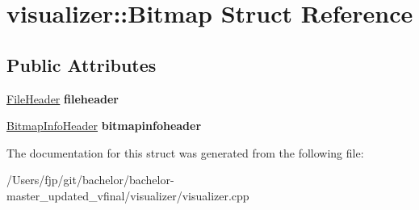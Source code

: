 \hypertarget{structvisualizer_1_1_bitmap}{}\section{visualizer\+:\+:Bitmap Struct Reference}
\label{structvisualizer_1_1_bitmap}
\subsection*{Public Attributes}
\begin{DoxyCompactItemize}
\item 
\mbox{\label{structvisualizer_1_1_bitmap_a35cd50ab96ca92a2f3cc92fbec0ccef0}} 
\mbox{\hyperlink{structvisualizer_1_1_file_header}{File\+Header}} {\bfseries fileheader}
\item 
\mbox{\label{structvisualizer_1_1_bitmap_ae321d14404bf8daff08333b6b2858603}} 
\mbox{\hyperlink{structvisualizer_1_1_bitmap_info_header}{Bitmap\+Info\+Header}} {\bfseries bitmapinfoheader}
\end{DoxyCompactItemize}


The documentation for this struct was generated from the following file\+:\begin{DoxyCompactItemize}
\item 
/\+Users/fjp/git/bachelor/bachelor-\/master\+\_\+updated\+\_\+vfinal/visualizer/visualizer.\+cpp\end{DoxyCompactItemize}
